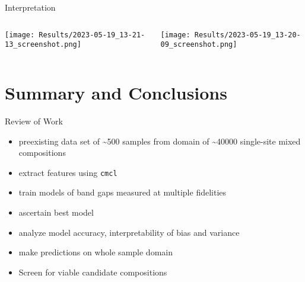 \documentclass[10pt, aspectratio=169, presentation]{beamer}
\begin{document}
\begin{frame}[label={sec:org574b3c2}]{Interpretation}
\begin{columns}
\begin{column}{0.5\columnwidth}
\begin{center}
\texttt{[image: Results/2023-05-19\_13-21-13\_screenshot.png]}
\end{center}
\end{column}

\begin{column}{0.5\columnwidth}
\begin{center}
\texttt{[image: Results/2023-05-19\_13-20-09\_screenshot.png]}
\end{center}
\end{column}
\end{columns}
\end{frame}

\section{Summary and Conclusions}
\label{sec:org6fef00a}
\begin{frame}[label={sec:orgc544821},fragile]{Review of Work}
 \begin{itemize}
\item preexisting data set of \textasciitilde{}500 samples from domain of \textasciitilde{}40000 single-site mixed compositions
\item extract features using \texttt{cmcl}
\item train models of band gaps measured at multiple fidelities
\item ascertain best model
\item analyze model accuracy, interpretability of bias and variance
\item make predictions on whole sample domain
\item Screen for viable candidate compositions
\end{itemize}
\end{frame}
\end{document}
